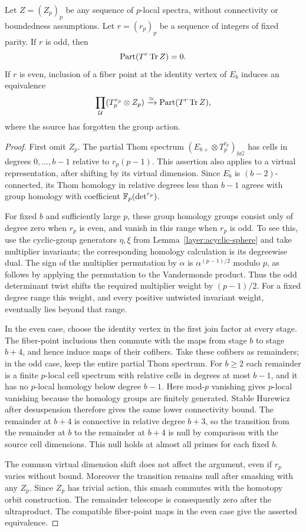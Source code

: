 \begin{lemma}
\label{layer:partial-thom}
Let $Z=(Z_p)_p$ be any sequence of $p$-local spectra, without
connectivity or boundedness assumptions. Let $r=(r_p)_p$ be a
sequence of integers of fixed parity. If $r$ is odd, then
\[
 \operatorname{Part}(T^r\operatorname{Tr} Z)=0.
\]
If $r$ is even, inclusion of a fiber point at the identity vertex of
$E_b$ induces an equivalence
\[
 \prod_{\mathcal U}(T_p^{r_p}\otimes Z_p)\xrightarrow{\simeq}
 \operatorname{Part}(T^r\operatorname{Tr} Z),
\]
where the source has forgotten the group action.
\end{lemma}

\begin{proof}
First omit $Z_p$. The partial Thom spectrum
$(E_{b+}\otimes T_p^{r_p})_{hG}$ has cells in degrees
$0,\ldots,b-1$ relative to $r_p(p-1)$. This assertion also applies
to a virtual representation, after shifting by its virtual
dimension. Since $E_b$ is $(b-2)$-connected, its Thom homology in
relative degrees less than $b-1$ agrees with group homology with
coefficient $\mathbb F_p(\det^{r_p})$.

For fixed $b$ and sufficiently large $p$, these group homology
groups consist only of degree zero when $r_p$ is even, and vanish
in this range when $r_p$ is odd. To see this, use the cyclic-group
generators $\eta,\xi$ from Lemma~\ref{layer:acyclic-sphere} and take
multiplier invariants; the corresponding homology calculation is
its degreewise dual. The sign of the multiplier permutation by
$\alpha$ is $\alpha^{(p-1)/2}$ modulo $p$, as follows by applying
the permutation to the Vandermonde product. Thus the odd
determinant twist shifts the required multiplier weight by
$(p-1)/2$. For a fixed degree range this weight, and every positive
untwisted invariant weight, eventually lies beyond that range.

In the even case, choose the identity vertex in the first join
factor at every stage. The fiber-point inclusions then commute with
the maps from stage $b$ to stage $b+4$, and hence induce maps of
their cofibers. Take these cofibers as remainders; in the odd case,
keep the entire partial Thom spectrum. For $b\geq2$ each remainder
is a finite $p$-local cell spectrum with relative cells in degrees
at most $b-1$, and it has no $p$-local homology below degree $b-1$.
Here mod-$p$ vanishing gives $p$-local vanishing because the homology
groups are finitely generated. Stable Hurewicz after desuspension
therefore gives the same lower connectivity bound. The remainder
at $b+4$ is connective in relative degree $b+3$, so the transition
from the remainder at $b$ to the remainder at $b+4$ is null by
comparison with the source cell dimensions. This null holds at
almost all primes for each fixed $b$.

The common virtual dimension shift does not affect the argument,
even if $r_p$ varies without bound. Moreover the transition remains
null after smashing with any $Z_p$. Since $Z_p$ has trivial action,
this smash commutes with the homotopy orbit construction. The
remainder telescope is consequently zero after the ultraproduct.
The compatible fiber-point maps in the even case give the asserted
equivalence.
\end{proof}

